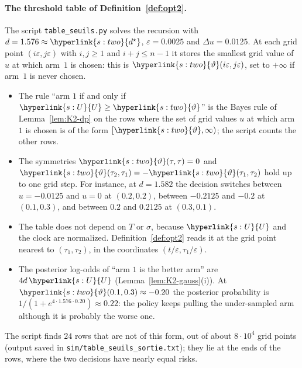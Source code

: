 \documentclass[11pt]{article}
\DeclareRobustCommand{\sy}[2]{{\hyperlink{#1}{#2}}}
\newcommand{\1}{\mathbf{1}}
\newcommand{\Ud}{\sy{s:U}{U}}
\newcommand{\dst}{\sy{s:two}{d^\star}}
\newcommand{\thr}{\sy{s:two}{\vartheta}}
\begin{document}
\paragraph{The threshold table of Definition~\ref{def:opt2}.} The script \texttt{table\_seuils.py} solves the recursion with $d=1.576\approx\dst$, $\varepsilon=0.0025$
and $\Delta u=0.0125$. At each grid point $(i\varepsilon,j\varepsilon)$ with $i,j\ge1$ and $i+j\le n-1$ it stores the smallest grid value of $u$ at which arm~$1$ is chosen: this
is $\thr(i\varepsilon,j\varepsilon)$, set to $+\infty$ if arm~$1$ is never chosen.
\begin{itemize}
\item The rule ``arm $1$ if and only if $\Ud\ge\thr$'' is the Bayes rule of Lemma~\ref{lem:K2-dp} on the rows where the set of grid values $u$ at which arm~$1$ is chosen
is of the form $[\thr,\infty)$; the script counts the other rows.
\item The symmetries $\thr(\tau,\tau)=0$ and $\thr(\tau_2,\tau_1)=-\thr(\tau_1,\tau_2)$ hold up to one grid step. For instance, at $d=1.582$ the decision switches
between $u=-0.0125$ and $u=0$ at $(0.2,0.2)$, between $-0.2125$ and $-0.2$ at $(0.1,0.3)$, and between $0.2$ and $0.2125$ at $(0.3,0.1)$.
\item The table does not depend on $T$ or $\sigma$, because $\Ud$ and the clock are normalized. Definition~\ref{def:opt2} reads it at the grid point nearest to
$(\tau_1,\tau_2)$, in the coordinates $(t/\varepsilon,\tau_1/\varepsilon)$.
\item The posterior log-odds of ``arm $1$ is the better arm'' are $4d\,\Ud$ (Lemma~\ref{lem:K2-gauss}(i)). At $\thr(0.1,0.3)\approx-0.20$ the posterior probability is
$1/(1+e^{4\cdot1.576\cdot0.20})\approx0.22$: the policy keeps pulling the under-sampled arm although it is probably the worse one.
\end{itemize}
\noindent The script finds $24$ rows that are not of this form, out of about $8\cdot10^4$ grid points (output saved in \texttt{sim/table\_seuils\_sortie.txt}); they lie
at the ends of the rows, where the two decisions have nearly equal risks.
\end{document}
